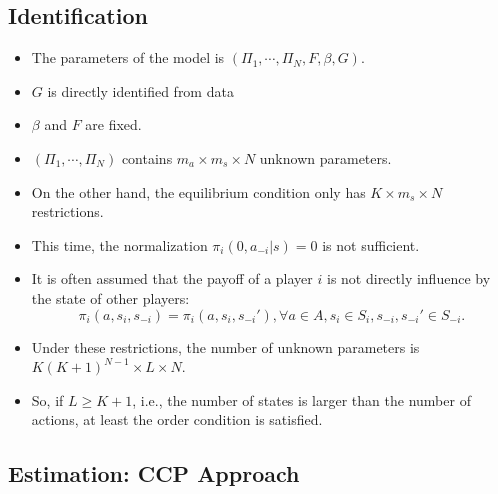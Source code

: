 \documentclass[
]{book}
\providecommand{\tightlist}{%
  \setlength{\itemsep}{0pt}\setlength{\parskip}{0pt}}
\begin{document}
\hypertarget{identification}{%
\subsection{Identification}\label{identification}}

\begin{itemize}
\tightlist
\item
  The parameters of the model is \((\Pi_1, \cdots, \Pi_N, F, \beta, G)\).
\item
  \(G\) is directly identified from data
\item
  \(\beta\) and \(F\) are fixed.
\item
  \((\Pi_1, \cdots, \Pi_N)\) contains \(m_a \times m_s \times N\) unknown parameters.
\item
  On the other hand, the equilibrium condition only has \(K \times m_s \times N\) restrictions.
\item
  This time, the normalization \(\pi_i(0, a_{-i}|s) = 0\) is not sufficient.
\item
  It is often assumed that the payoff of a player \(i\) is not directly influence by the state of other players:
  \begin{equation}
  \pi_i(a, s_i, s_{-i}) = \pi_i(a, s_i, s_{-i}'), \forall a \in A, s_i \in S_i, s_{-i}, s_{-i}' \in S_{-i}.
  \end{equation}
\item
  Under these restrictions, the number of unknown parameters is \(K (K + 1)^{N - 1} \times L \times N\).
\item
  So, if \(L \ge K + 1\), i.e., the number of states is larger than the number of actions, at least the order condition is satisfied.
\end{itemize}

\hypertarget{estimation-ccp-approach}{%
\subsection{Estimation: CCP Approach}\label{estimation-ccp-approach}}
\end{document}
